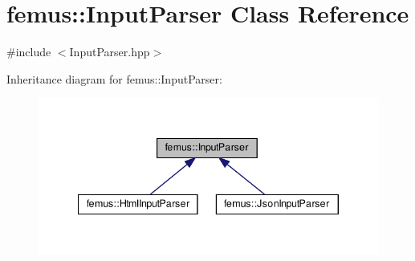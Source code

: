 \hypertarget{classfemus_1_1_input_parser}{}\section{femus\+:\+:Input\+Parser Class Reference}
\label{classfemus_1_1_input_parser}


{\ttfamily \#include $<$Input\+Parser.\+hpp$>$}



Inheritance diagram for femus\+:\+:Input\+Parser\+:
\nopagebreak
\begin{figure}[H]
\begin{center}
\leavevmode
\includegraphics[width=340pt]{classfemus_1_1_input_parser__inherit__graph}
\end{center}
\end{figure}
